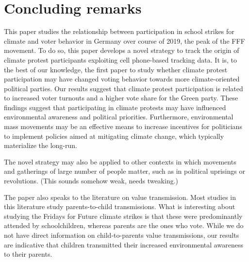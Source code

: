 










\bigskip
\section{Concluding remarks}\label{sec_greta_cons:conclusion}

This paper studies the relationship between participation in school strikes for climate and voter behavior in Germany over course of 2019, the peak of the FFF movement. To do so, this paper develops a novel strategy to track the origin of climate protest participants exploiting cell phone-based tracking data. It is, to the best of our knowledge, the first paper to study whether climate protest participation may have changed voting behavior towards more climate-oriented political parties. Our results suggest that climate protest participation is related to increased voter turnouts and a higher vote share for the Green party. These findings suggest that participating in climate protests may have influenced environmental awareness and political priorities. Furthermore, environmental mass movements may be an effective means to increase incentives for politicians to implement policies aimed at mitigating climate change, which typically materialize the long-run. 



The novel strategy may also be applied to other contexts in which movements and gatherings of large number of people matter, such as in political uprisings or revolutions. (This sounds somehow weak, needs tweaking.)

The paper also speaks to the literature on value transmission. Most studies in this literature study parents-to-child transmissions. What is interesting about studying the Fridays for Future climate strikes is that these were predominantly attended by schoolchildren, whereas parents are the ones who vote. While we do not have direct information on child-to-parents value transmissions, our results are indicative that children transmitted their increased environmental awareness to their parents.